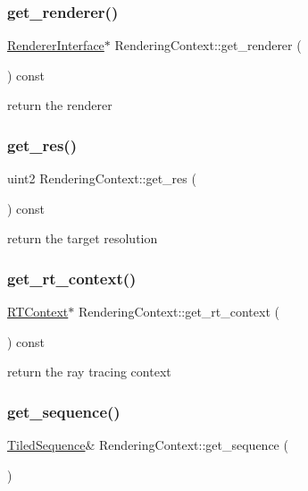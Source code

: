 \subsubsection{\texorpdfstring{get\+\_\+renderer()}{get\_renderer()}}
{\footnotesize\ttfamily \hyperlink{struct_renderer_interface}{Renderer\+Interface}$\ast$ Rendering\+Context\+::get\+\_\+renderer (\begin{DoxyParamCaption}{ }\end{DoxyParamCaption}) const}

return the renderer \mbox{\label{struct_rendering_context_a670efd63118c93bd395ee998bba36435}} 
\subsubsection{\texorpdfstring{get\+\_\+res()}{get\_res()}}
{\footnotesize\ttfamily uint2 Rendering\+Context\+::get\+\_\+res (\begin{DoxyParamCaption}{ }\end{DoxyParamCaption}) const}

return the target resolution \mbox{\label{struct_rendering_context_af12ae90cc453d139f6f8ae35791e6563}} 
\subsubsection{\texorpdfstring{get\+\_\+rt\+\_\+context()}{get\_rt\_context()}}
{\footnotesize\ttfamily \hyperlink{struct_r_t_context}{R\+T\+Context}$\ast$ Rendering\+Context\+::get\+\_\+rt\+\_\+context (\begin{DoxyParamCaption}{ }\end{DoxyParamCaption}) const}

return the ray tracing context \mbox{\label{struct_rendering_context_aa977bf2683fb8e125638687be102e33b}} 
\subsubsection{\texorpdfstring{get\+\_\+sequence()}{get\_sequence()}}
{\footnotesize\ttfamily \hyperlink{struct_tiled_sequence}{Tiled\+Sequence}\& Rendering\+Context\+::get\+\_\+sequence (\begin{DoxyParamCaption}{ }\end{DoxyParamCaption})}

